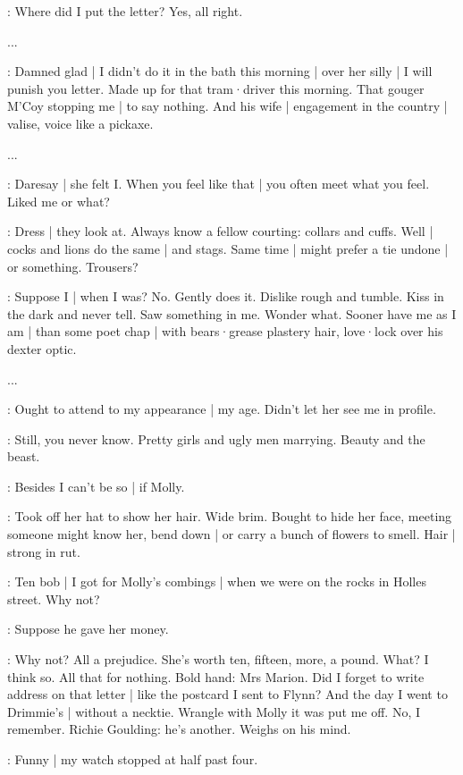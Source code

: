 \BloomToday:
Where did I put the letter?
Yes,
all right.

...

\BloomToday:
Damned glad |
I didn't do it in the bath this morning |
over her silly |
I will punish you letter.
Made up for that tram·driver this morning.
That gouger M'Coy stopping me |
to say nothing.
And his wife |
engagement in the country |
valise,
voice like a pickaxe.

...

\BloomCurrent:
Daresay |
she felt I.
When you feel like that |
you often meet what you feel.
Liked me or what?

\BloomAbstract:
Dress |
they look at.
Always know a fellow courting:
collars and cuffs.%
Well |
cocks and lions do the same |
and stags.
Same time |
might prefer a tie undone |
or something.
Trousers?

\BloomCurrent:
Suppose I |
when I was?
No.
Gently does it.
Dislike rough and tumble.
Kiss in the dark
and never tell.
Saw something in me.
Wonder what.
Sooner have me
as I am |
than some poet chap |
with bears·grease plastery hair,
love·lock over his dexter optic.

...

\BloomCurrent:
Ought to attend to my appearance |
my age.
Didn't let her see me in profile.

\BloomAbstract:
Still,
you never know.
Pretty girls and ugly men marrying.
Beauty and the beast.

\BloomHist:
Besides I can't be so |
if Molly.

\BloomCurrent:
Took off her hat to show her hair.
Wide brim.
Bought to hide her face,
meeting someone might know her,
bend down |
or carry a bunch of flowers to smell.
Hair |
strong in rut.

\BloomHist:
Ten bob |
I got for Molly's combings |
when we were on the rocks
in Holles street.
Why not?

\BloomToday:
Suppose he gave her money.

\BloomHist:
Why not?
All a prejudice.
She's worth ten,
fifteen,
more,
a pound.
What?
I think so.
All that for nothing.
Bold hand:
Mrs Marion.
Did I forget
to write address on that letter |
like the postcard I sent to Flynn?
And the day I went to Drimmie's |
without a necktie.
Wrangle with Molly
it was put me off.
No,
I remember.
Richie Goulding:
he's another.
Weighs on his mind.

\BloomToday:
Funny |
my watch stopped at half past four.


